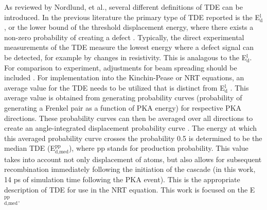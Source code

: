 \documentclass[review]{elsarticle}
\begin{document}
As reviewed by Nordlund, et al.\cite{nordlund2006}, several different definitions of TDE can be introduced. In the previous literature the primary type of TDE reported is the E$^{\textrm{l}}_{\textrm{d}}$, or the lower bound of the threshold displacement energy, where there exists a non-zero probability of creating a defect \cite{malerba2002}. Typically, the direct experimental measurements of the TDE measure the lowest energy where a defect signal can be detected, for example by changes in resistivity. This is analagous to the E$^{\textrm{l}}_{\textrm{d}}$. For comparison to experiment, adjustments for beam spreading should be included \cite{nordlund2006}. For implementation into the Kinchin-Pease or NRT equations, an average value for the TDE needs to be utilized that is distinct from E$^{\textrm{l}}_{\textrm{d}}$ \cite{nordlund2006,norgett1975}. This average value is obtained from generating probability curves (probability of generating a Frenkel pair as a function of PKA energy) for respective PKA directions. These probability curves can then be averaged over all directions to create an angle-integrated displacement probability curve \cite{nordlund2006}. The energy at which this averaged probability curve crosses the probability 0.5 is determined to be the median TDE (E$^{\textrm{pp}}_{\textrm{d,med}}$), where pp stands for production probability. This value takes into account not only displacement of atoms, but also allows for subsequent recombination immediately following the initiation of the cascade (in this work, 14 ps of simulation time following the PKA event). This is the appropriate description of TDE for use in the NRT equation. This work is focused on the E$^{\textrm{pp}}_{\textrm{d,med}}$.
\end{document}
